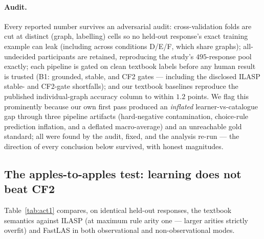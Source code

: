 \documentclass[review,12pt]{elsarticle}
\theoremstyle{definition}
\theoremstyle{remark}
\begin{document}
\paragraph{Audit.} Every reported number survives an adversarial audit:
cross-validation folds are cut at distinct (graph, labelling) cells so no
held-out response's exact training example can leak (including across
conditions D/E/F, which share graphs); all-undecided participants are retained,
reproducing the study's $495$-response pool exactly; each pipeline is gated on
clean textbook labels before any human result is trusted (B1: grounded,
stable, and CF2 gates --- including the
disclosed ILASP stable- and CF2-gate shortfalls); and our textbook
baselines reproduce the published individual-graph accuracy column to within
$1.2$ points. We flag this prominently because our own first pass produced an
\emph{inflated} learner-vs-catalogue gap through three pipeline artifacts
(hard-negative contamination, choice-rule prediction inflation, and a deflated
macro-average) and an unreachable gold standard; all were found by the audit,
fixed, and the analysis re-run --- the direction of every conclusion below
survived, with honest magnitudes.

\subsection{The apples-to-apples test: learning does not beat CF2}
\label{sec:act1}

Table~\ref{tab:act1} compares, on identical held-out responses, the textbook
semantics against ILASP (at maximum rule arity one --- larger arities strictly
overfit) and FastLAS in both observational and non-observational modes.
\end{document}
